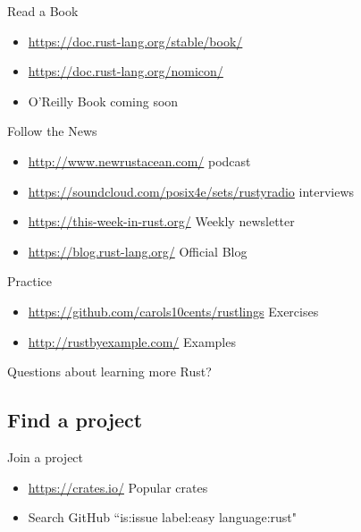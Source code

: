 \documentclass[50pt]{beamer}
\begin{document}
\begin{frame}
    Read a Book
    \begin{itemize}
        \item \url{https://doc.rust-lang.org/stable/book/}
        \item \url{https://doc.rust-lang.org/nomicon/}
        \item O'Reilly Book coming soon
    \end{itemize}
\end{frame}

\begin{frame}
    Follow the News
    \begin{itemize}
        \item \url{http://www.newrustacean.com/} podcast
        \item \url{https://soundcloud.com/posix4e/sets/rustyradio} interviews
        \item \url{https://this-week-in-rust.org/} Weekly newsletter
        \item \url{https://blog.rust-lang.org/} Official Blog
    \end{itemize}
\end{frame}

\begin{frame}
    Practice
    \begin{itemize}
        \item \url{https://github.com/carols10cents/rustlings} Exercises
        \item \url{http://rustbyexample.com/} Examples
    \end{itemize}
\end{frame}

\begin{frame}
    Questions about learning more Rust?
\end{frame}


\subsection{Find a project}

\begin{frame}
    Join a project
    \begin{itemize}
        \item \url{https://crates.io/} Popular crates
        \item Search GitHub ``is:issue label:easy language:rust"
    \end{itemize}
\end{frame}
\end{document}
